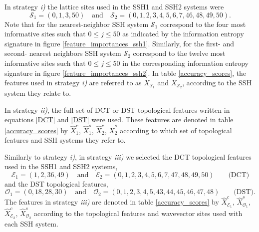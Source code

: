 \documentclass[10pt]{revtex4-1}
\begin{document}
In strategy \emph{i)} the lattice sites used in the SSH1 and SSH2 systems were
\begin{equation}
\label{lattice_subsets}
\mathcal{S}_1 = (0, 1, 3, 50 ) \quad \text{and} \quad  \mathcal{S}_2 =(0, 1, 2, 3, 4, 5, 6, 7, 46, 48, 49, 50).   
\end{equation}
Note that for the nearest-neighbor SSH system $\mathcal{S}_1$ correspond to the four most informative sites such that $0\leq j \leq 50$ as indicated by the information entropy signature in figure \ref{feature_importances_ssh1}. Similarly, for the first- and second- nearest neighbors SSH system $\mathcal{S}_2$ correspond to the twelve most informative sites such that $0\leq j \leq 50$ in the corresponding information entropy signature in figure \ref{feature_importances_ssh2}. In table \ref{accuracy_scores}, the features used in strategy \emph{i)} are referred to as $X_{\mathcal{S}_1}$ and $X_{\mathcal{S}_2}$, according to the SSH system they relate to.  

In strategy \emph{ii)}, the full set of DCT or DST topological features written in equations \eqref{DCT} and \eqref{DST} were used. These features are denoted in table \ref{accuracy_scores} by $\hat{X}^c_1$, $\hat{X}^s_1$, $\hat{X}^c_2$, $\hat{X}^s_2$ according to which set of topological features and SSH systems they refer to. 

Similarly to strategy \emph{i)}, in strategy \emph{iii)} we selected the DCT topological features used in the SSH1 and SSH2 systems,
\begin{equation}
\label{DCT_subsets}
\mathcal{E}_1 = (1, 2, 36, 49) \quad \text{and} \quad  \mathcal{E}_2 =(0, 1, 2, 3, 4, 5, 6, 7, 47, 48, 49, 50) \qquad \text{(DCT)}  
\end{equation}
and the DST topological features,
\begin{equation}
\label{DST_subsets}
\mathcal{O}_1 =  (0, 18, 28, 30) \quad \text{and} \quad  \mathcal{O}_2 = (0, 1, 2, 3, 4, 5, 43, 44, 45, 46, 47, 48) \qquad \text{(DST)}.  
\end{equation}
The features in strategy \emph{iii)} are denoted in table \ref{accuracy_scores} by $\hat{X}^c_{\mathcal{E}_1}$, $\hat{X}^s_{\mathcal{O}_1}$, $\hat{X}^c_{\mathcal{E}_2}$, $\hat{X}^s_{\mathcal{O}_2}$ according to the topological features and wavevector sites used with each SSH system. 
\end{document}
